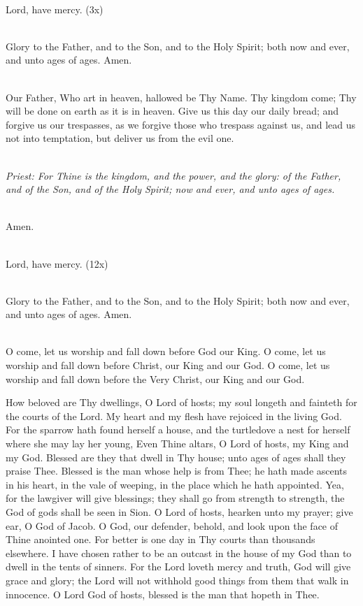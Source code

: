 {\mbox{}\\
Lord, have mercy. (3x)

\mbox{}\\
Glory to the Father, and to the Son, and to the Holy Spirit;
both now and ever, 
and unto ages of ages. Amen.

\mbox{}\\
Our Father, Who art in heaven, hallowed be Thy Name. Thy kingdom come; 
Thy will be done on earth as it is in heaven.
Give us this day our daily bread; 
and forgive us our trespasses,
as we forgive those who trespass against us, and 
lead us not into temptation, but deliver us from the evil one. 

\mbox{}\\
\emph{Priest: For Thine is the kingdom, and the power,
and the glory: of the Father, and of 
the Son, and of the Holy Spirit; now and ever, and unto ages of ages.}

\mbox{}\\
Amen.

\mbox{}\\
Lord, have mercy. (12x)

\mbox{}\\
Glory to the Father, and to the Son, and to the Holy Spirit;
both now and ever, 
and unto ages of ages. Amen.

\mbox{}\\ 
O come, let us worship and fall down before God our King. 
O come, let us worship and fall down before Christ, our King and our God. 
O come, let us worship and fall down before the Very Christ, our King and our 
God. 

How beloved are Thy dwellings, O Lord of hosts;
my soul longeth and fainteth for the 
courts of the Lord. 
My heart and my flesh have rejoiced in the living God. 
For the sparrow hath found herself a house,
and the turtledove a nest for herself where 
she may lay her young, 
Even Thine altars, O Lord of hosts, my King and my God. 
Blessed are they that dwell in Thy house;
unto ages of ages shall they praise Thee. 
Blessed is the man whose help is from Thee;
he hath made ascents in his heart, in the vale 
of weeping, in the place which he hath appointed. 
Yea, for the lawgiver will give blessings;
they shall go from strength to strength, the God 
of gods shall be seen in Sion. 
O Lord of hosts, hearken unto my prayer; give ear, O God of Jacob. 
O God, our defender, behold, and look upon the face of Thine anointed one. 
For better is one day in Thy courts than thousands elsewhere. 
I have chosen rather to be an outcast in the house of my God than to dwell in 
the tents of 
sinners. 
For the Lord loveth mercy and truth,
God will give grace and glory; the Lord will not 
withhold good things from them that walk in innocence. 
O Lord God of hosts, blessed is the man that hopeth in Thee. 

}
